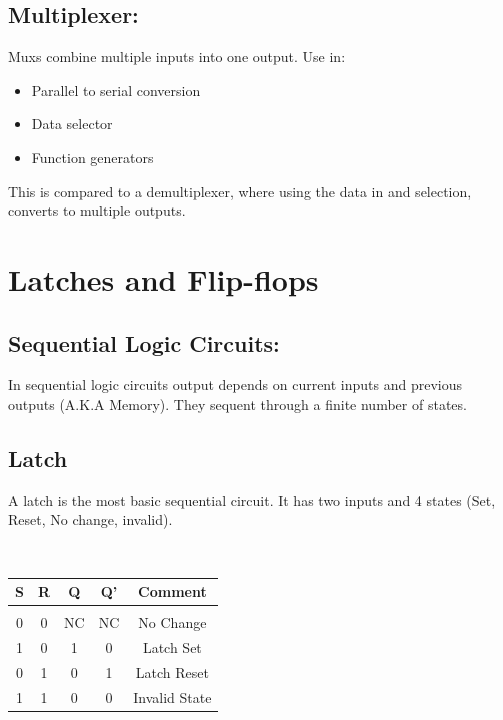 \documentclass[a5paper]{article}
\begin{document}
	\subsection{Multiplexer:}
	Muxs combine multiple inputs into one output. Use in:
	\begin{itemize}
		\item Parallel to serial conversion
		\item Data selector
		\item Function generators
	\end{itemize}
	This is compared to a demultiplexer, where using the data in and selection, converts to multiple outputs.

	\section{Latches and Flip-flops}
	\subsection{Sequential Logic Circuits:}
	In sequential logic circuits output depends on current inputs and previous outputs (A.K.A Memory). They sequent through a finite number of states.
	\subsection{Latch}
	A latch is the most basic sequential circuit. It has two inputs and 4 states (Set, Reset, No change, invalid).
	\begin{center}
	\\[1\baselineskip]
	\begin{tabular}{ c c | c c | c }
		S & R & Q & Q' & Comment\\
		\hline\\
		0 & 0 & NC & NC & No Change\\
		1 & 0 & 1 & 0 & Latch Set\\
		0 & 1 & 0 & 1 & Latch Reset\\
		1 & 1 & 0 & 0 & Invalid State
	\end{tabular}
	\end{center}
\end{document}
